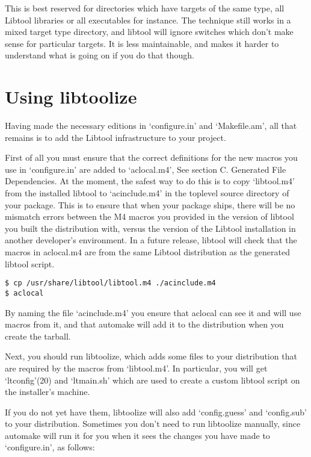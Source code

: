  This is best reserved for directories which have targets of the same type, all Libtool libraries or all executables for instance. The technique still works in a mixed target type directory, and libtool will ignore switches which don't make sense for particular targets. It is less maintainable, and makes it harder to understand what is going on if you do that though. 

\section{Using libtoolize}


Having made the necessary editions in `configure.in' and `Makefile.am', all that remains is to add the Libtool infrastructure to your project. 


First of all you must ensure that the correct definitions for the new macros you use in `configure.in' are added to `aclocal.m4', See section C. Generated File Dependencies. At the moment, the safest way to do this is to copy `libtool.m4' from the installed libtool to `acinclude.m4' in the toplevel source directory of your package. This is to ensure that when your package ships, there will be no mismatch errors between the M4 macros you provided in the version of libtool you built the distribution with, versus the version of the Libtool installation in another developer's environment. In a future release, libtool will check that the macros in aclocal.m4 are from the same Libtool distribution as the generated libtool script. 


\begin{verbatim}
$ cp /usr/share/libtool/libtool.m4 ./acinclude.m4
$ aclocal
\end{verbatim} 

By naming the file `acinclude.m4' you ensure that aclocal can see it and will use macros from it, and that automake will add it to the distribution when you create the tarball. 


Next, you should run libtoolize, which adds some files to your distribution that are required by the macros from `libtool.m4'. In particular, you will get `ltconfig'(20) and `ltmain.sh' which are used to create a custom libtool script on the installer's machine. 


If you do not yet have them, libtoolize will also add `config.guess' and `config.sub' to your distribution. Sometimes you don't need to run libtoolize manually, since automake will run it for you when it sees the changes you have made to `configure.in', as follows: 

